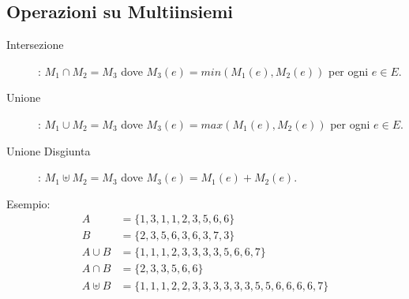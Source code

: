 \subsection{Operazioni su Multiinsiemi}
\begin{description}
    \item[Intersezione]: $M_1 \cap M_2 = M_3$ dove $M_3(e) = min(M_1(e),M_2(e))$ per ogni $e \in E$.
    \item[Unione]: $M_1 \cup M_2 = M_3$ dove $M_3(e) = max(M_1(e),M_2(e))$ per ogni $e \in E$.
    \item[Unione Disgiunta]: $M_1 \uplus M_2 = M_3$ dove $M_3(e) = M_1(e) + M_2(e)$.
\end{description}

Esempio:
\begin{equation*}
\begin{split}
A & = \{ 1,3,1,1,2,3,5,6,6 \} \\
B & = \{ 2,3,5,6,3,6,3,7,3 \} \\
A \cup B & = \{ 1,1,1,2,3,3,3,3,5,6,6,7 \} \\
A \cap B & = \{ 2,3,3,5,6,6 \} \\
A \uplus B & = \{1,1,1,2,2,3,3,3,3,3,3,5,5,6,6,6,6,7 \} \\
\end{split}
\end{equation*}
